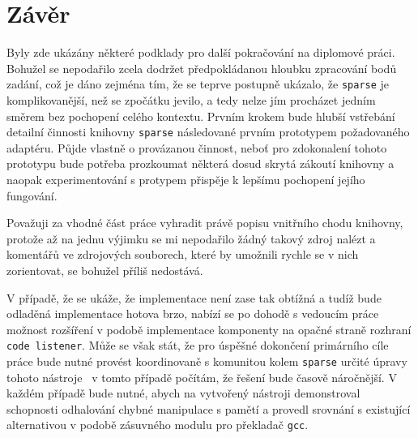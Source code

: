\chapter{Závěr}
\label{chap:zaver}

Byly zde ukázány některé podklady pro další pokračování na diplomové práci.
Bohužel se nepodařilo zcela dodržet předpokládanou hloubku zpracování
bodů zadání, což je dáno zejména tím, že se teprve postupně ukázalo, že
\texttt{sparse} je komplikovanější, než se zpočátku jevilo, a tedy
nelze jím procházet jedním směrem bez pochopení celého kontextu.
Prvním krokem bude hlubší vstřebání detailní činnosti knihovny \texttt{sparse}
následované prvním prototypem požadovaného adaptéru. Půjde vlastně o provázanou
činnost, neboť pro zdokonalení tohoto prototypu bude potřeba prozkoumat některá
dosud skrytá zákoutí knihovny a naopak experimentování s protypem přispěje
k lepšímu pochopení jejího fungování.

Považuji za vhodné část práce vyhradit právě popisu vnitřního chodu knihovny,
protože až na jednu výjimku se mi nepodařilo žádný takový zdroj nalézt
a komentářů ve zdrojových souborech, které by umožnili rychle se v nich
zorientovat, se bohužel příliš nedostává.

V případě, že se ukáže, že implementace není zase tak obtížná a tudíž
bude odladěná implementace hotova brzo, nabízí se po dohodě s vedoucím
práce možnost rozšíření v podobě implementace komponenty na opačné straně
rozhraní \texttt{code listener}. Může se však stát, že pro úspěšné dokončení
primárního cíle práce bude nutné provést koordinovaně s komunitou kolem
\texttt{sparse} určité úpravy tohoto nástroje \ndash\ v tomto případě
počítám, že řešení bude časově náročnější. V každém případě bude nutné,
abych na vytvořený nástroji demonstroval schopnosti odhalování chybné
manipulace s pamětí a provedl srovnání s existující alternativou
v podobě zásuvného modulu pro překladač \texttt{gcc}.
